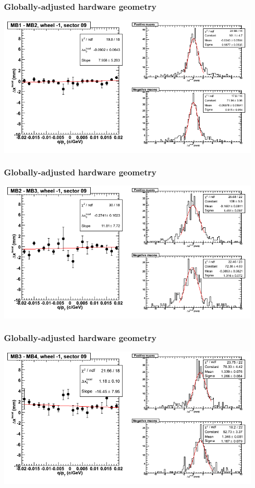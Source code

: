 \documentclass[compress]{beamer}
\begin{document}
\begin{frame}
\frametitle{Globally-adjusted hardware geometry}
\includegraphics[width=\linewidth]{NOV4_segdiffs_HW/dt13_resid_B_09_12.png}
\end{frame}

\begin{frame}
\frametitle{Globally-adjusted hardware geometry}
\includegraphics[width=\linewidth]{NOV4_segdiffs_HW/dt13_resid_B_09_23.png}
\end{frame}

\begin{frame}
\frametitle{Globally-adjusted hardware geometry}
\includegraphics[width=\linewidth]{NOV4_segdiffs_HW/dt13_resid_B_09_34.png}
\end{frame}
\end{document}

